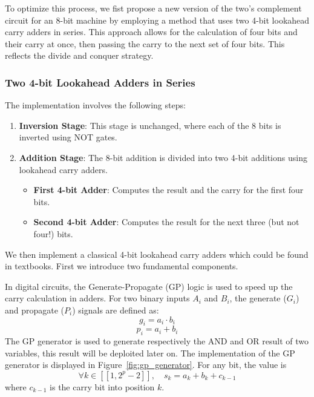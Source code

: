 \documentclass[conference]{IEEEtran}
\begin{document}
To optimize this process, we fist propose a new version of the two's complement circuit for an 8-bit machine by employing a method that uses two 4-bit lookahead carry adders in series. This approach allows for the calculation of four bits and their carry at once, then passing the carry to the next set of four bits. This reflects the divide and conquer strategy.

\subsubsection{Two 4-bit Lookahead Adders in Series}

The implementation involves the following steps:
\begin{enumerate}
    \item \textbf{Inversion Stage}: This stage is unchanged, where each of the 8 bits is inverted using NOT gates.
    \item \textbf{Addition Stage}: The 8-bit addition is divided into two 4-bit additions using lookahead carry adders.
    \begin{itemize}
        \item \textbf{First 4-bit Adder}: Computes the result and the carry for the first four bits.
        \item \textbf{Second 4-bit Adder}: Computes the result for the next three (but not four!) bits.
    \end{itemize}
\end{enumerate}

We then implement a classical 4-bit lookahead carry adders which could be found in textbooks. First we introduce two fundamental components.

In digital circuits, the Generate-Propagate (GP) logic is used to speed up the carry calculation in adders. For two binary inputs $A_i$ and $B_i$, the generate ($G_i$) and propagate ($P_i$) signals are defined as:
\begin{equation}
g_i = a_i \cdot b_i
\end{equation}
\begin{equation}
p_i = a_i + b_i
\end{equation}
The GP generator is used to generate respectively the AND and OR result of two variables, this result will be deploited later on.
The implementation of the GP generator is displayed in Figure~\ref{fig:gp_generator}. For any bit, the value is 
\begin{equation}
    \forall k \in [\![1, 2^p-2]\!], \quad s_k = a_k + b_k + c_{k-1}
\end{equation}
where $c_{k-1}$ is the carry bit into position $k$.
\end{document}
